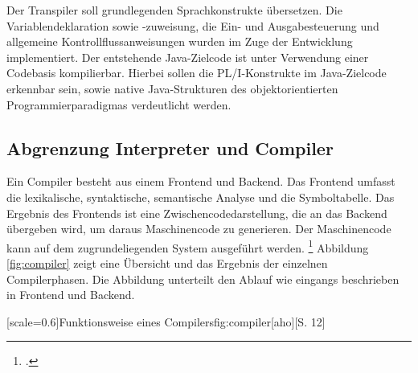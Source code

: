 
Der Transpiler soll grundlegenden Sprachkonstrukte übersetzen. Die Variablendeklaration sowie -zuweisung, die Ein- und Ausgabesteuerung und allgemeine Kontrollflussanweisungen wurden im Zuge der Entwicklung implementiert. Der entstehende Java-Zielcode ist unter Verwendung einer Codebasis kompilierbar. Hierbei sollen die  PL/I-Konstrukte im Java-Zielcode erkennbar sein, sowie native Java-Strukturen des objektorientierten Programmierparadigmas verdeutlicht werden.

%
	
 
    \pagebreak

\subsection{Abgrenzung Interpreter und Compiler}
  
Ein Compiler besteht aus einem Frontend und Backend. Das Frontend umfasst die lexikalische, syntaktische, semantische Analyse und die Symboltabelle.
Das Ergebnis des Frontends ist eine Zwischencodedarstellung, die an das Backend übergeben wird, um daraus Maschinencode zu generieren. Der Maschinencode kann auf dem zugrundeliegenden System ausgeführt werden. \footcite[Vgl. ][S.106ff. ]{aho}
Abbildung \ref{fig:compiler} zeigt eine Übersicht und das Ergebnis der einzelnen Compilerphasen. Die Abbildung unterteilt den Ablauf wie eingangs beschrieben in Frontend und Backend.

[scale=0.6]{Funktionsweise eines Compilers}{fig:compiler}[aho][S. 12]

